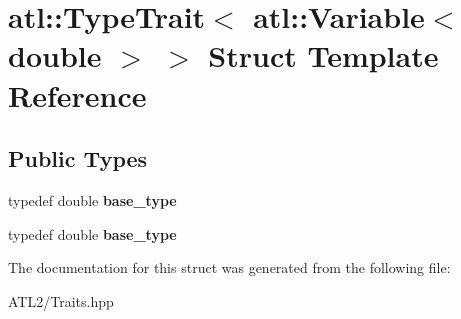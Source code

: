 \hypertarget{structatl_1_1_type_trait_3_01atl_1_1_variable_3_01double_01_4_01_4}{\section{atl\+:\+:Type\+Trait$<$ atl\+:\+:Variable$<$ double $>$ $>$ Struct Template Reference}
\label{structatl_1_1_type_trait_3_01atl_1_1_variable_3_01double_01_4_01_4}
}
\subsection*{Public Types}
\begin{DoxyCompactItemize}
\item 
\hypertarget{structatl_1_1_type_trait_3_01atl_1_1_variable_3_01double_01_4_01_4_a5c4261790b15aff5c31c2955c0a57ce0}{typedef double {\bfseries base\+\_\+type}}\label{structatl_1_1_type_trait_3_01atl_1_1_variable_3_01double_01_4_01_4_a5c4261790b15aff5c31c2955c0a57ce0}

\item 
\hypertarget{structatl_1_1_type_trait_3_01atl_1_1_variable_3_01double_01_4_01_4_a5c4261790b15aff5c31c2955c0a57ce0}{typedef double {\bfseries base\+\_\+type}}\label{structatl_1_1_type_trait_3_01atl_1_1_variable_3_01double_01_4_01_4_a5c4261790b15aff5c31c2955c0a57ce0}

\end{DoxyCompactItemize}


The documentation for this struct was generated from the following file\+:\begin{DoxyCompactItemize}
\item 
A\+T\+L2/Traits.\+hpp\end{DoxyCompactItemize}
